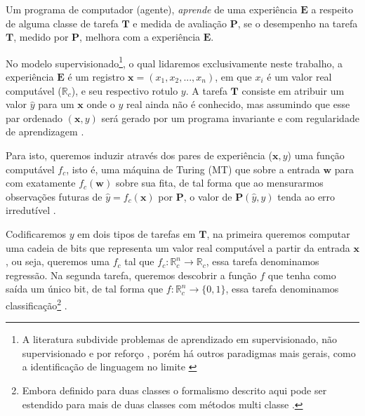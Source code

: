\begin{definition}
Um programa de computador (agente), \textit{aprende} de uma experiência
$\boldsymbol E$ a respeito de alguma classe de tarefa $\boldsymbol T$ e medida
de avaliação $\boldsymbol P$, se o desempenho na tarefa $\boldsymbol T$,
medido por $\boldsymbol P$, melhora com a experiência $\boldsymbol E$.
\end{definition}

No modelo supervisionado\footnote{A literatura subdivide problemas de
aprendizado em supervisionado, não supervisionado e por reforço
\cite{russell2016artificial,friedman2001elements,goodfellow2016deep},
porém há outros paradigmas mais gerais, como a identificação de linguagem no
limite \cite{gold1967language}}, o qual lidaremos exclusivamente neste
trabalho, a experiência $\boldsymbol E$ é um registro
$\boldsymbol{x}=(x_1,x_2,...,x_n)$, em que $x_i$ é um valor real computável
($\mathbb{R}_c$), e seu respectivo rotulo $y$. A tarefa $\boldsymbol T$
consiste em atribuir um valor $\hat{y}$ para um $\boldsymbol{x}$ onde o $y$
real ainda não é conhecido, mas assumindo que esse par ordenado
$(\boldsymbol{x},y)$ será gerado por um programa invariante e com regularidade de aprendizagem
\cite{mohri2018foundations,valiant1984theory}.

Para isto, queremos induzir através dos pares de experiência
($\boldsymbol{x},y$) uma função computável $f_c$, isto é, uma máquina
de Turing (MT) que sobre a entrada $\boldsymbol{w}$ para com exatamente
$f_c(\boldsymbol{w})$ sobre sua fita, de tal forma que ao mensurarmos
observações futuras de $\hat{y}=f_c(\boldsymbol{x})$ por $\boldsymbol P$, o valor de
$\boldsymbol{P}(\hat{y},y)$ tenda ao erro irredutível
\cite{mohri2018foundations,mitchell1997machine,friedman2001elements}.

Codificaremos $y$ em dois tipos de tarefas em $\boldsymbol{T}$, na primeira
queremos computar uma cadeia de bits que representa um valor real
computável a partir da entrada $\boldsymbol{x}$, ou seja, queremos uma $f_c$
tal que $f_c:\mathbb{R}_c^n\longrightarrow \mathbb{R}_c$, essa tarefa
denominamos regressão. Na segunda tarefa, queremos descobrir a função
$f$ que tenha como saída um único bit, de tal forma que
$f:\mathbb{R}_c^n\longrightarrow \{0,1\}$, essa tarefa denominamos
classificação\footnote{Embora definido para duas classes o formalismo
descrito aqui pode ser estendido para mais de duas classes com métodos
multi classe \cite{abu2012learning}.} \cite{goodfellow2016deep,
mohri2018foundations}.

